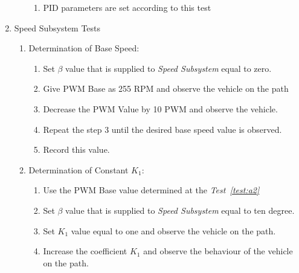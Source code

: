 \documentclass[a4paper,12pt]{article}
\begin{document}
\begin{enumerate}
\begin{enumerate}
\begin{enumerate}
\item  PID parameters are set according to this test

\end{enumerate}



\end{enumerate}





\item {Speed Subsystem Tests}

\begin{enumerate}

\item Determination of Base Speed: \label{test:a2}	

\begin{enumerate}

\item Set $\beta$ value that is supplied to \textit{Speed Subsystem} equal to zero.

\item Give PWM Base as 255 RPM and observe the vehicle on the path 

\item Decrease the PWM Value by 10 PWM and observe the vehicle.

\item Repeat the step 3 until the desired base speed value is observed.

\item Record this value.

\end{enumerate}


\item Determination of Constant $K_1$:

\begin{enumerate}

\item Use the PWM Base value determined at the \textit{Test~\ref{test:a2}}

\item Set $\beta$ value that is supplied to \textit{Speed Subsystem} equal to ten degree.

\item Set $K_1$ value equal to one and observe the vehicle on the path.

\item Increase the coefficient $K_1$ and observe the behaviour of the vehicle on the path.


\end{enumerate}
\end{enumerate}
\end{enumerate}
\end{document}
